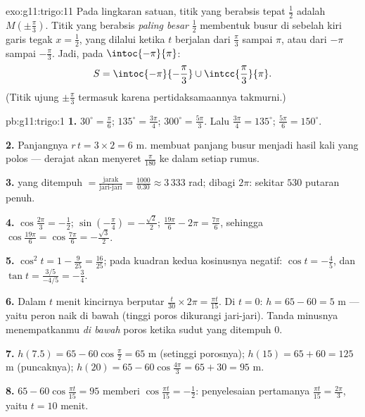 \begin{solution}{exo:g11:trigo:11}
Pada lingkaran satuan, titik yang berabsis tepat $\frac12$ adalah
$M\!\left(\pm\frac\pi3\right)$. Titik yang berabsis \emph{paling besar}
$\frac12$ membentuk busur di sebelah kiri garis tegak $x = \frac12$,
yang dilalui ketika $t$ berjalan dari $\frac\pi3$ sampai $\pi$, atau dari
$-\pi$ sampai $-\frac\pi3$. Jadi, pada $\intoc{-\pi}{\pi}$:
\[
S = \intoc{-\pi}{-\frac{\pi}{3}} \cup \intcc{\frac{\pi}{3}}{\pi}.
\]
(Titik ujung $\pm\frac\pi3$ termasuk karena pertidaksamaannya takmurni.)
\end{solution}

\begin{solution}{pb:g11:trigo:1}
\textbf{1.} $30^\circ = \frac{\pi}{6}$; $135^\circ =
\frac{3\pi}{4}$; $300^\circ = \frac{5\pi}{3}$. Lalu
$\frac{3\pi}{4} = 135^\circ$; $\frac{5\pi}{6} = 150^\circ$.

\textbf{2.} Panjangnya $r\,t = 3 \times 2 = 6$ m.  membuat panjang
busur menjadi hasil kali yang polos --- derajat akan menyeret
$\frac{\pi}{180}$ ke dalam setiap rumus.

\textbf{3.}  yang ditempuh $= \frac{\text{jarak}}
{\text{jari-jari}} = \frac{1000}{0.30} \approx 3\,333$ rad;
dibagi $2\pi$: sekitar $530$ putaran penuh.

\textbf{4.} $\cos\frac{2\pi}{3} = -\frac12$;
$\sin\left(-\frac\pi4\right) = -\frac{\sqrt2}{2}$;
$\frac{19\pi}{6} - 2\pi = \frac{7\pi}{6}$, sehingga
$\cos\frac{19\pi}{6} = \cos\frac{7\pi}{6} =
-\frac{\sqrt3}{2}$.

\textbf{5.} $\cos^2 t = 1 - \frac{9}{25} = \frac{16}{25}$; pada
kuadran kedua kosinusnya negatif:
$\cos t = -\frac45$, dan
$\tan t = \frac{3/5}{-4/5} = -\frac34$.

\textbf{6.} Dalam $t$ menit kincirnya berputar
$\frac{t}{30} \times 2\pi = \frac{\pi t}{15}$. Di $t = 0$:
$h = 65 - 60 = 5$ m --- yaitu peron naik di bawah
(tinggi poros dikurangi jari-jari). Tanda minusnya menempatkanmu
\emph{di bawah} poros ketika sudut yang ditempuh $0$.

\textbf{7.} $h(7.5) = 65 - 60\cos\frac{\pi}{2} = 65$ m (setinggi
porosnya); $h(15) = 65 + 60 = 125$ m (puncaknya);
$h(20) = 65 - 60\cos\frac{4\pi}{3} = 65 + 30 = 95$ m.

\textbf{8.} $65 - 60\cos\frac{\pi t}{15} = 95$ memberi
$\cos\frac{\pi t}{15} = -\frac12$: penyelesaian pertamanya
$\frac{\pi t}{15} = \frac{2\pi}{3}$, yaitu $t = 10$ menit.


\end{solution}
